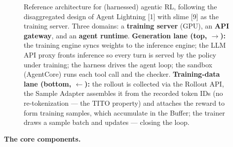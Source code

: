 \documentclass[
  paper=a4,
  ,captions=tableheading
]{scrartcl}
\begin{document}
\begin{figure}[htbp]
{%
}
\caption{Reference architecture for (harnessed) agentic RL, following the disaggregated design of Agent Lightning [1] with slime [9] as the training server. Three domains: a \textbf{training server} (GPU), an \textbf{API gateway}, and an \textbf{agent runtime}. \textbf{Generation lane (top, $\rightarrow$):} the training engine syncs weights to the inference engine; the LLM API proxy fronts inference so every turn is served by the policy under training; the harness drives the agent loop; the sandbox (AgentCore) runs each tool call and the checker. \textbf{Training-data lane (bottom, $\leftarrow$):} the rollout is collected via the Rollout API, the Sample Adapter assembles it from the recorded token IDs (no re-tokenization --- the TITO property) and attaches the reward to form training samples, which accumulate in the Buffer; the trainer draws a sample batch and updates --- closing the loop.}
\end{figure}

\textbf{The core components.}
\end{document}

